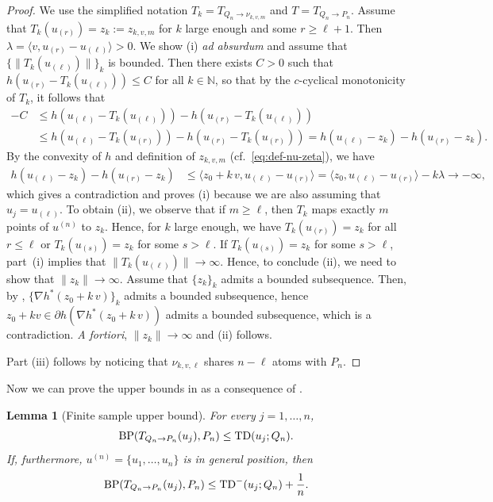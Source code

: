 \documentclass[11pt]{article}
\newcommand{\NN}{\mathbb{N}}
\theoremstyle{plain}
\newtheorem{lemma}[theorem]{Lemma}
\theoremstyle{definition}\newtheorem{definition}[theorem]{Definition}
\theoremstyle{remark}
\begin{document}
\begin{proof}
   We use the simplified notation  $T_{k}=T_{Q_n\to \nu_{k,v,m}}$ and $T=T_{Q_n\to P_n}$. Assume that $ T_k(u_{(r)})= z_k:=z_{k,v,m} $ for $k$ large enough and some $r\geq \ell+1$. Then $\lambda= \langle v, u_{(r)}-u_{(\ell)}\rangle>0$. We show (i) {\it ad absurdum} and assume that $\{\|T_k(u_{(\ell)})\|\}_k$ is bounded.  Then there exists $C>0$ such that 
$ h( u_{(r)}-T_{k}(u_{(\ell)}))  \leq C  $ for all $k\in \NN$, so that by the $c$-cyclical monotonicity of $T_k$,  it follows that 
\begin{align*}
    -C&\leq    h( u_{(\ell)}-T_{k}(u_{(\ell)}))-h( u_{(r)}-T_{k}(u_{(\ell)}))\\
    &\leq  h( u_{(\ell)}-T_{k}(u_{(r)}))-h( u_{(r)}-T_{k}(u_{(r)})) =  h( u_{(\ell)}-z_k)-h( u_{(r)}-z_k) .
\end{align*}
By the convexity of $h$ and definition of $z_{k,v,m}$ (cf.~\eqref{eq:def-nu-zeta}), we have 
\begin{align*}
     h( u_{(\ell)}-z_k)-h( u_{(r)}-z_k)  &\leq  \langle z_0+  k\,v ,u_{(\ell)}-u_{(r)}\rangle = \langle z_0 ,u_{(\ell)}-u_{(r)}\rangle  -k \lambda \to -\infty,
\end{align*}
which gives a contradiction and  proves (i) because we are also assuming that $u_j=u_{(\ell)}$.  To obtain (ii), we observe that if $m\geq \ell $, then $T_{k}$ maps exactly $m$ points of $u^{(n)}$ to $z_k$. Hence, for $k$ large enough, we have $T_{k}(u_{(r)}) =z_k   $ for all $r\leq \ell$  or $T_{k}(u_{(s)}) =z_k   $   for some $ s>\ell$. If $T_{k}(u_{(s)}) =z_k   $   for some $ s>\ell$,  part~(i) implies that   $\|T_{k}(u_{(\ell)})\|\to \infty   $. Hence, to  conclude (ii), we need to show that $\|z_k\|\to \infty$. Assume that   $\{z_k\}_k$ admits a bounded  subsequence. Then, by \cite[Proposition~16.20]{Bauschke.2017.convex},  
 $\{\nabla h^{*}(z_0+k\, v)\}_k$ admits a bounded subsequence, hence 
  $z_0+kv \in \partial h (\nabla h^{*}(z_0+k\, v))$ admits  a bounded subsequence, which is a contradiction. {\it A fortiori}, $\|z_k\|\to \infty$ and (ii) follows. 

Part (iii) follows by noticing that $ \nu_{k,v,\ell}$ shares $n-\ell$ atoms with $ P_n$. 
\end{proof}
Now we can prove the upper bounds in 
as a consequence of . 
\begin{lemma}[Finite sample upper bound]\label{lem:finite_sample_UB}
For every $j=1, \dots, n$, 
\begin{equation}
    \label{eq:discrete-BP-proof}
     {\rm BP}({ T}_{Q_n\to P_n}(u_j), P_n) \leq  {\rm TD}(u_j;Q_n) .
\end{equation}
If, furthermore, $u^{(n)}=\{u_1, \dots, u_n\}$ is in general position, then 
\begin{equation}
    \label{eq:General-Position-proof}
    {\rm BP}({ T}_{Q_n\to P_n}(u_j), P_n) \leq  
{\rm TD}^{-}(u_j;Q_n)+\frac{1}{n}.
\end{equation}
\end{lemma}
\end{document}
